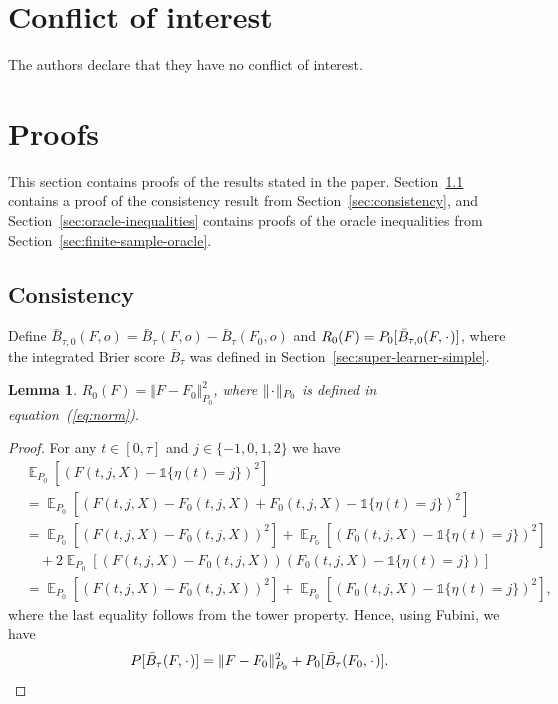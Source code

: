 \documentclass[a4paper,danish]{article}
\theoremstyle{plain} %
\numberwithin{theorem}{section}
\newtheorem{lemma}[theorem]{Lemma}
\theoremstyle{definition} %
\theoremstyle{remark}
\DeclareMathOperator{\E}{\mathbb{E}} %
\newcommand{\blank}{\makebox[1ex]{\textbf{$\cdot$}}}
\newcommand{\1}{\mathds{1}}
\begin{document}
\section*{Conflict of interest}

The authors declare that they have no conflict of interest.




\appendix

\section{Proofs}
\label{sec:proofs}

This section contains proofs of the results stated in the
paper. Section~\ref{sec:consistency-proof} contains a proof of
the consistency result from Section~\ref{sec:consistency}, and
Section~\ref{sec:oracle-inequalities} contains proofs of the
oracle inequalities from
Section~\ref{sec:finite-sample-oracle}.

\subsection{Consistency}
\label{sec:consistency-proof}

Define
\( \bar{B}_{\tau,0}(F, o) = \bar{B}_{\tau}(F, o) - \bar{B}_{\tau}(F_0, o) \) and
\( R_{0}(F) = P_0{[\bar{B}_{\tau,0}(F, \blank)]} \), where the integrated Brier
score \( \bar{B}_{\tau} \) was defined in
Section~\ref{sec:super-learner-simple}.
\begin{lemma}
  \label{lemma:norm}
  \( R_{0}(F) = \Vert F - F_0 \Vert_{P_0}^2 \), where \( \Vert \blank \Vert_{P_0}\) is defined
  in equation~(\ref{eq:norm}).
\end{lemma}
\begin{proof}[Proof]
  For any \( t \in [0, \tau] \) and \( j\in \{-1,0,1,2\} \) we have
  \begin{align*}
    & \E_{P_0}{\left[ (F(t, j, X) - \1{\{\eta(t) = j \}})^2 \right]}
    \\
    & =    \E_{P_0}{\left[ (F(t, j, X) - F_0(t, j, X) + F_0(t, j, X) - \1{\{\eta(t) = j
      \}})^2 \right]}
    \\
    & =    \E_{P_0}{\left[ (F(t, j, X) - F_0(t, j, X))^2\right]}
      + \E_{P_0}{\left[ (F_0(t, j, X) - \1{\{\eta(t) = j \}})^2\right]}
    \\
    & \quad
      + 2\E_{P_0}{\left[ (F(t, j, X) - F_0(t, j, X))(F_0(t, j, X) - \1{\{\eta(t) = j
      \}})\right]}
    \\
    & =    \E_{P_0}{\left[ (F(t, j, X) - F_0(t, j, X))^2\right]}
      + \E_{P_0}{\left[ (F_0(t, j, X) - \1{\{\eta(t) = j \}})^2\right]},
  \end{align*}
  where the last equality follows from the tower property. Hence, using Fubini,
  we have
  \begin{equation*}
    P{[\bar{B}_{\tau}(F, \blank)]}
    = \Vert F - F_0 \Vert_{P_0}^2 + P_0{[\bar{B}_{\tau}(F_0, \blank)]}.
  \end{equation*}
\end{proof}
\end{document}
